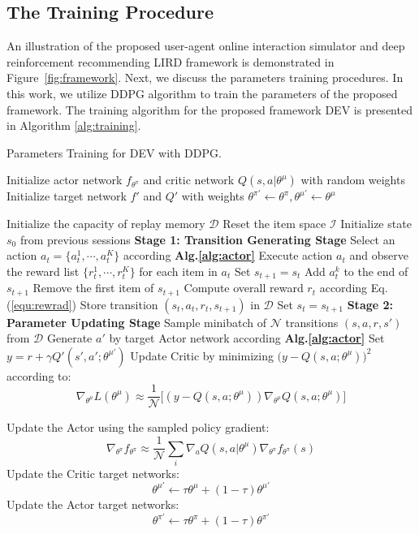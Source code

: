 \subsection{The Training Procedure}
\label{sec:training}
An illustration of the proposed user-agent online interaction simulator and deep reinforcement recommending LIRD framework is demonstrated in Figure~\ref{fig:framework}. Next, we discuss the parameters training procedures.  In this work, we utilize DDPG algorithm\cite{lillicrap2015continuous} to train the parameters of the proposed framework. The training algorithm for the proposed framework DEV is presented in Algorithm \ref{alg:training}.
\begin{small}
	\begin{algorithm}
		\caption{\label{alg:training} Parameters Training for DEV with DDPG.}
		\raggedright
		\begin{algorithmic} [1]
			\STATE Initialize actor network $f_{\theta^\pi}$ and critic network $Q(s,a|\theta^{\mu})$ with random weights	
			\STATE Initialize target network $f'$ and $Q'$ with weights $\theta^{\pi'}\leftarrow\theta^{\pi}, \theta^{\mu'}\leftarrow\theta^{\mu}$
			
			\STATE Initialize the capacity of replay memory $\mathcal{D}$
			\STATE Reset the item space $\mathcal{I}$
			\STATE  Initialize state $s_{0}$ from previous sessions
			\STATE \textbf{Stage 1: Transition Generating Stage}
			\STATE  Select an action $a_t = \{a_t^1,  \cdots, a_t^K\}$ according \textbf{Alg.\ref{alg:actor}}
			\STATE  Execute action $a_t$ and observe the reward list $\{r_t^1,  \cdots, r_t^K\}$ for each item in $a_t$
			\STATE Set $s_{t+1} = s_{t}$
			\STATE  Add $a_{t}^k$ to the end of $s_{t+1}$
			\STATE  Remove the first item of $s_{t+1}$
			\ENDIF
			\ENDFOR
			\STATE Compute overall reward $r_t$ according Eq. (\ref{equ:rewrad})
			\STATE  Store transition $(s_{t}, a_{t},  r_{t},s_{t+1})$ in $\mathcal{D}$
			\STATE Set $s_{t} = s_{t+1}$
			\STATE \textbf{Stage 2: Parameter Updating Stage}
			\STATE  Sample minibatch of $\mathcal{N}$ transitions $(s, a, r, s')$ from $\mathcal{D}$
			\STATE Generate $a'$  by target Actor network according \textbf{Alg.\ref{alg:actor}}
			\STATE  Set $y=  r+\gamma Q'(s',a';\theta^{\mu'})  $
			\STATE  Update Critic by minimizing $\big(y-Q(s, a;\theta^\mu)\big)^{2}$ according to:
			$$\nabla_{\theta^\mu}L(\theta^\mu) \approx\frac{1}{\mathcal{N}}\big[(y-Q(s, a;\theta^\mu))\nabla_{\theta^\mu}Q(s, a;\theta^\mu)\big]$$
			
			\STATE  Update the Actor using the sampled policy gradient: $$\nabla_{\theta^{\pi}}f_{\theta^\pi}\approx\frac{1}{\mathcal{N}}\sum_{i}\nabla_{a}Q(s, a|\theta^{\mu})\nabla_{\theta^{\pi}}f_{\theta^\pi}(s)$$
			\STATE Update the Critic target networks: $$\theta^{\mu'}\leftarrow\tau\theta^{\mu}+(1-\tau)\theta^{\mu'}$$
			\STATE Update the Actor target networks:
			$$
			\theta^{\pi'}\leftarrow\tau\theta^{\pi}+(1-\tau)\theta^{\pi'}
			$$
			\ENDFOR 
			\ENDFOR 
		\end{algorithmic}
	\end{algorithm}
\end{small}


